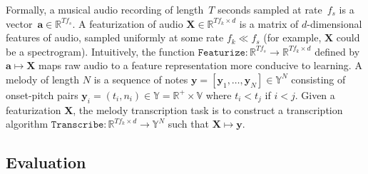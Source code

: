 Formally, a musical audio recording of length~$T$ seconds sampled at rate~$f_s$ is a vector~${\bm{a} \in \mathbb{R}^{Tf_s}}$. 
A featurization of audio ${\bm{X} \in \mathbb{R}^{Tf_k \times d}}$ is a matrix of $d$-dimensional features of audio, sampled uniformly at some rate ${f_k \ll f_s}$ (for example, $\bm{X}$ could be a spectrogram).
Intuitively, the function ${\texttt{Featurize} : \mathbb{R}^{Tf_s} \to \mathbb{R}^{Tf_k \times d}}$ defined by ${\bm{a} \mapsto \bm{X}}$ maps 
raw audio 
to a feature representation more conducive to learning. 
A melody of length $N$ is a sequence of notes 
$\bm{y} = [\bm{y}_1,\dots,\bm{y}_N] \in \mathbb{Y}^N$
consisting of onset-pitch pairs ${\bm{y}_i = (t_i,n_i)} \in \mathbb{Y} = \mathbb{R}^+ \times \mathbb{V}$ where ${t_i < t_j}$ if ${i < j}$. Given a featurization $\bm{X}$, the melody transcription task is to construct a transcription algorithm ${\texttt{Transcribe} : \mathbb{R}^{Tf_k \times d} \to \mathbb{Y}^N}$ such that ${\bm{X} \mapsto \bm{y}}$.




\subsection{Evaluation}
\label{sec:eval}

